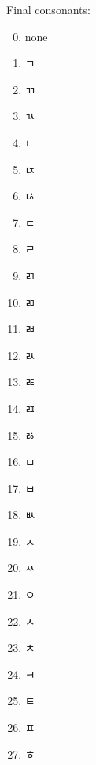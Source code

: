 \documentclass{article}
\begin{document}
    Final consonants:
    \begin{enumerate}
      \setcounter{enumi}{-1} %
      \item none
      \item ㄱ
      \item ㄲ
      \item ㄳ
      \item ㄴ
      \item ㄵ
      \item ㄶ
      \item ㄷ
      \item ㄹ
      \item ㄺ
      \item ㄻ
      \item ㄼ
      \item ㄽ
      \item ㄾ
      \item ㄿ
      \item ㅀ
      \item ㅁ
      \item ㅂ
      \item ㅄ
      \item ㅅ
      \item ㅆ
      \item ㅇ
      \item ㅈ
      \item ㅊ
      \item ㅋ
      \item ㅌ
      \item ㅍ
      \item ㅎ
    \end{enumerate}
\end{document}
